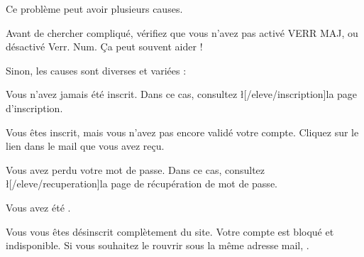 Ce problème peut avoir plusieurs causes.

Avant de chercher compliqué, vérifiez que vous n'avez pas activé VERR MAJ, ou désactivé Verr. Num. Ça peut souvent aider !

Sinon, les causes sont diverses et variées :
\item Vous n'avez jamais été inscrit. Dans ce cas, consultez \l[/eleve/inscription]{la page d'inscription}.
\item Vous êtes inscrit, mais vous n'avez pas encore validé votre compte. Cliquez sur le lien dans le mail que vous avez reçu.
\item Vous avez perdu votre mot de passe. Dans ce cas, consultez \l[/eleve/recuperation]{la page de récupération de mot de passe}.
\item Vous avez été .
\item Vous vous êtes désinscrit complètement du site. Votre compte est bloqué et indisponible. Si vous souhaitez le rouvrir sous la même adresse mail, .
